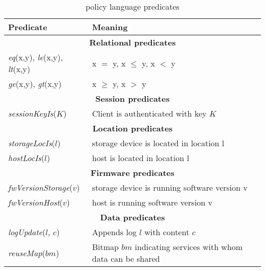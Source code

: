 \begin{table}[t]\small
\setlength\tabcolsep{0pt}
\centering
\begin{tabular}{p{3cm} p{5.5cm}}

\bfseries Predicate & \bfseries Meaning \\%

\hline
\multicolumn{2}{c}{\bfseries Relational predicates}  \\

\hline
\textit{eq}(x,y), \textit{le}(x,y), \textit{lt}(x,y) & x $=$ y, x $\leq$ y,  x $<$ y \\
\textit{ge}(x,y), \textit{gt}(x,y) & x $\geq$ y, x $>$ y\\

\hline
\multicolumn{2}{c}{\bfseries Session predicates} \\

\hline
\textit{sessionKeyIs}($K$) & Client is authenticated with key $K$ \\

\hline
\multicolumn{2}{c}{\bfseries Location predicates} \\

\hline
\textit{storageLocIs}($l$) & storage device is located in location l \\
\textit{hostLocIs}($l$) & host is located in location l \\

\hline
\multicolumn{2}{c}{\bfseries Firmware predicates} \\

\hline
\textit{fwVersionStorage}($v$) & storage device is running software version v \\
\textit{fwVersionHost}($v$) & host is running software version v \\

\hline
\multicolumn{2}{c}{\bfseries Data predicates}   \\

\hline
\textit{logUpdate}($l$, $c$) & Appends log $l$ with content $c$\\
\textit{reuseMap}($bm$) & Bitmap $bm$ indicating services with whom data can be shared\\
\hline
\end{tabular}
\caption{\small \project{} policy language predicates}\label{tab:secndp-language}
\vspace{-3mm}
\end{table}
